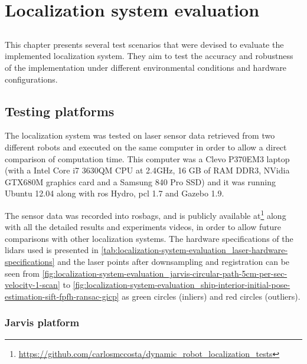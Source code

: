 \chapter{Localization system evaluation} \label{chap:localization-system-evaluation}



\section*{}

This chapter presents several test scenarios that were devised to evaluate the implemented localization system. They aim to test the accuracy and robustness of the implementation under different environmental conditions and hardware configurations.



\section{Testing platforms}

The localization system was tested on laser sensor data retrieved from two different robots and executed on the same computer in order to allow a direct comparison of computation time. This computer was a Clevo P370EM3 laptop (with a Intel Core i7 3630QM CPU at 2.4GHz, 16 GB of RAM DDR3, NVidia GTX680M graphics card and a Samsung 840 Pro SSD) and it was running Ubuntu 12.04 along with \gls{ros} Hydro, \gls{pcl} 1.7 and Gazebo 1.9.

The sensor data was recorded into rosbags, and is publicly available at\footnote{\url{https://github.com/carlosmccosta/dynamic_robot_localization_tests}} along with all the detailed results and experiments videos, in order to allow future comparisons with other localization systems. The hardware specifications of the \glspl{lidar} used is presented in \cref{tab:localization-system-evaluation_laser-hardware-specifications} and the laser points after downsampling and registration can be seen from \cref{fig:localization-system-evaluation_jarvis-circular-path-5cm-per-sec-velocity-1-scan} to \cref{fig:localization-system-evaluation_ship-interior-initial-pose-estimation-sift-fpfh-ransac-gicp} as green circles (inliers) and red circles (outliers).


\subsection{Jarvis platform}

